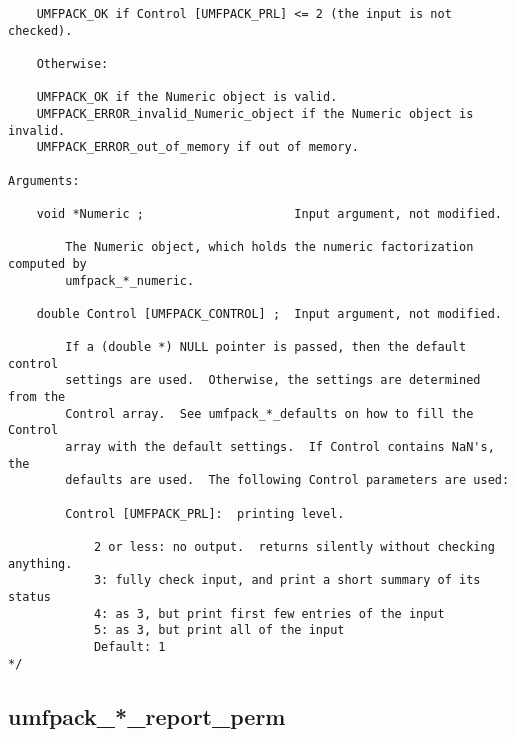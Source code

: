 \documentclass[11pt]{article}
\begin{document}
{\begin{verbatim}
    UMFPACK_OK if Control [UMFPACK_PRL] <= 2 (the input is not checked).

    Otherwise:

    UMFPACK_OK if the Numeric object is valid.
    UMFPACK_ERROR_invalid_Numeric_object if the Numeric object is invalid.
    UMFPACK_ERROR_out_of_memory if out of memory.

Arguments:

    void *Numeric ;                     Input argument, not modified.

        The Numeric object, which holds the numeric factorization computed by
        umfpack_*_numeric.

    double Control [UMFPACK_CONTROL] ;  Input argument, not modified.

        If a (double *) NULL pointer is passed, then the default control
        settings are used.  Otherwise, the settings are determined from the
        Control array.  See umfpack_*_defaults on how to fill the Control
        array with the default settings.  If Control contains NaN's, the
        defaults are used.  The following Control parameters are used:

        Control [UMFPACK_PRL]:  printing level.

            2 or less: no output.  returns silently without checking anything.
            3: fully check input, and print a short summary of its status
            4: as 3, but print first few entries of the input
            5: as 3, but print all of the input
            Default: 1
*/
\end{verbatim}
}

\newpage
\subsection{umfpack\_*\_report\_perm}
\end{document}
